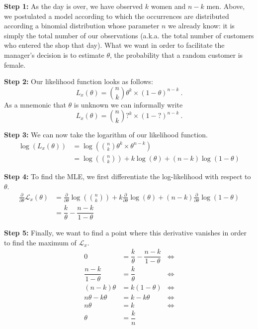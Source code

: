 \textbf{Step 1:} As the day is over, we have observed $ k $ women and $ n-k $ men. Above, we postulated a model
according to which the
occurrences are distributed according a binomial distribution whose parameter $ n $ we already know: it
is simply the total number of our observations (a.k.a. the total number of customers who entered the shop 
that day). What we want in order to facilitate the manager's decision is to estimate $ \theta $, the
probability that a random customer is female. 

\textbf{Step 2:} Our likelihood function looks as follows:
\begin{equation}
L_{x}(\theta) = \binom{n}{k} \theta^{k} \times (1 - \theta)^{n-k} \ .
\end{equation}
As a mnemonic that $ \theta $ is unknown we can informally write
$$ L_{x}(\theta) = \binom{n}{k} ?^{k} \times (1-?)^{n-k} \ . $$

\textbf{Step 3:} We can now take the logarithm of our likelihood function.
\begin{align}
\log(L_{x}(\theta)) &= \log\left(\binom{n}{k} \theta^{k} \times \theta^{n-k} \right) \\
&= \log \left(\binom{n}{k}\right) + k\log(\theta) + (n-k)\log(1-\theta)
\end{align}

\textbf{Step 4:} To find the MLE, we first differentiate the log-likelihood with respect to $ \theta $.
\begin{align}
\frac{\partial}{\partial \theta} \mathcal{L}_{x}(\theta)
&= \frac{\partial}{\partial \theta} \log \left(\binom{n}{k}\right) + k \frac{\partial}{\partial \theta} \log(\theta) + (n-k) \frac{\partial}{\partial \theta} \log(1-\theta) \\
&= \dfrac{k}{\theta} - \dfrac{n-k}{1-\theta}
\end{align}

\textbf{Step 5:} Finally, we want to find a point where this derivative vanishes in order to find the maximum of $ \mathcal{L}_{x} $.
\begin{align}
0 &= \dfrac{k}{\theta} - \dfrac{n-k}{1-\theta} &\Leftrightarrow \\
\dfrac{n-k}{1- \theta} &= \dfrac{k}{\theta} &\Leftrightarrow \\
(n-k) \theta &= k (1 - \theta) &\Leftrightarrow \\
n\theta- k\theta &= k - k \theta &\Leftrightarrow \\
n\theta&= k &\Leftrightarrow \\
\theta &= \dfrac{k}{n}
\end{align}

